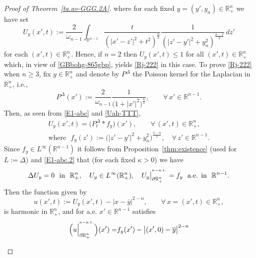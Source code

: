 \documentclass[11pt,reqno]{amsart}
\numberwithin{equation}{section}
\theoremstyle{remark}
\begin{document}
\begin{proof}[Proof of Theorem~\ref{ta.av-GGG.2A}]
%
where for each fixed $y=(y',y_n)\in{\mathbb{R}}^n_{+}$ we have set
%
\begin{equation}\label{E1-abc}
U_y(x',t):=\frac{2}{\omega_{n-1}}
\int_{{\mathbb{R}}^{n-1}}\frac{t}{(|x'-z'|^2+t^2)^{\frac{n}{2}}}
\frac{1}{(|z'-y'|^2+y_n^2)^{\frac{n-2}{2}}}\,dz'
\end{equation}
%
for each $(x',t)\in{\mathbb{R}}^n_{+}$. Hence, if $n=2$ then $U_y(x',t)\leq 1$ for all $(x',t)\in{\mathbb{R}}^n_{+}$ 
which, in view of \eqref{GBbohg-865gbp}, yields \eqref{Rj-222} in this case. 
To prove \eqref{Rj-222} when $n\geq 3$, fix $y\in{\mathbb{R}}^n_{+}$ and 
denote by $P^\Delta$ the Poisson kernel for the Laplacian in ${\mathbb{R}}^n_{+}$, i.e., 
%
\begin{equation}\label{Uah-TTT}
P^{\Delta}(x'):=\frac{2}{\omega_{n-1}}\frac{1}{\big(1+|x'|^2\big)^{\frac{n}{2}}},
\qquad\forall\,x'\in{\mathbb{R}}^{n-1}.
\end{equation}
%
Then, as seen from \eqref{E1-abc} and \eqref{Uah-TTT}, 
%
\begin{equation}\label{E1-abc.2}
\begin{array}{c}
U_y(x',t)=\big(P^\Delta_t\ast f_y\big)(x'),
\qquad\forall\,(x',t)\in{\mathbb{R}}^n_{+},
\\[12pt]
\text{where }\,\,f_y(z'):=\big(|z'-y'|^2+y_n^2\big)^{\frac{2-n}{2}},
\quad\forall\,z'\in{\mathbb{R}}^{n-1}.
\end{array}
\end{equation}
%
Since $f_y\in L^\infty({\mathbb{R}}^{n-1})$ it follows from Proposition~\ref{thm:existence} 
(used for $L:=\Delta$) and \eqref{E1-abc.2} that (for each fixed $\kappa>0$) we have 
%
\begin{equation}\label{E1-abc.2BB}
\Delta U_y=0\,\,\text{ in }\,\,{\mathbb{R}}^n_{+},\quad U_y\in L^\infty({\mathbb{R}}^n_{+}),\quad
U_y\big|^{{}^{\kappa-{\rm n.t.}}}_{\partial{\mathbb{R}}^n_{+}}=f_y\,\,\text{ a.e. in }\,\,{\mathbb{R}}^{n-1}.
\end{equation}
%
Then the function given by 
%
\begin{equation}\label{E1-abc.3}
u(x',t):=U_y(x',t)-|x-\overline{y}|^{2-n},\qquad\forall\,x=(x',t)\in{\mathbb{R}}^n_{+},
\end{equation}
%
is harmonic in ${\mathbb{R}}^n_{+}$, and for a.e. $x'\in{\mathbb{R}}^{n-1}$ satisfies
%
\begin{align}\label{E1-abc.4}
\Big(u\Big|^{{}^{\kappa-{\rm n.t.}}}_{\partial{\mathbb{R}}^n_{+}}\Big)(x')
=& f_y(x')-\big|(x',0)-\overline{y}\big|^{2-n}
\nonumber\\[4pt]

\end{align}
\end{proof}
\end{document}
